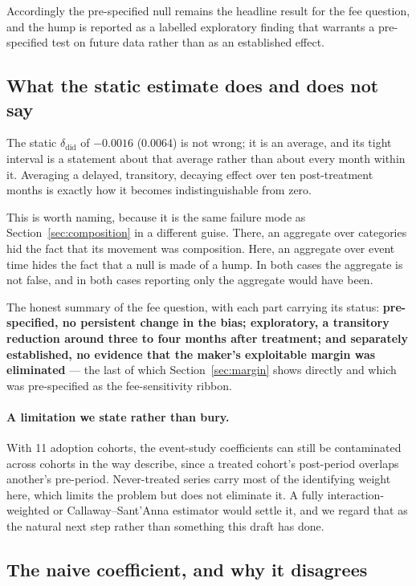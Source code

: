 \documentclass[preprint,12pt,authoryear]{elsarticle}
\begin{document}
Accordingly the pre-specified null remains the headline result for the fee
question, and the hump is reported as a labelled exploratory finding that
warrants a pre-specified test on future data rather than as an established
effect.

\subsection{What the static estimate does and does not say}\label{sec:whatstatic}

The static $\delta_{\mathrm{did}}$ of $-0.0016$ (0.0064) is not wrong; it is an
average, and its tight interval is a statement about that average rather than
about every month within it. Averaging a delayed, transitory, decaying effect
over ten post-treatment months is exactly how it becomes indistinguishable from
zero.

This is worth naming, because it is the same failure mode as
Section~\ref{sec:composition} in a different guise. There, an aggregate over
categories hid the fact that its movement was composition. Here, an aggregate
over event time hides the fact that a null is made of a hump. In both cases the
aggregate is not false, and in both cases reporting only the aggregate would
have been.

The honest summary of the fee question, with each part carrying its status:
\textbf{pre-specified, no persistent change in the bias; exploratory, a
transitory reduction around three to four months after treatment; and separately
established, no evidence that the maker's exploitable margin was eliminated} ---
the last of which Section~\ref{sec:margin} shows directly and which was
pre-specified as the fee-sensitivity ribbon.

\paragraph{A limitation we state rather than bury.} With 11 adoption cohorts,
the event-study coefficients can still be contaminated across cohorts in the way
\citet{sun2021} describe, since a treated cohort's post-period overlaps
another's pre-period. Never-treated series carry most of the identifying weight
here, which limits the problem but does not eliminate it. A fully
interaction-weighted or Callaway--Sant'Anna estimator would settle it, and we
regard that as the natural next step rather than something this draft has done.

\subsection{The naive coefficient, and why it disagrees}
\end{document}
